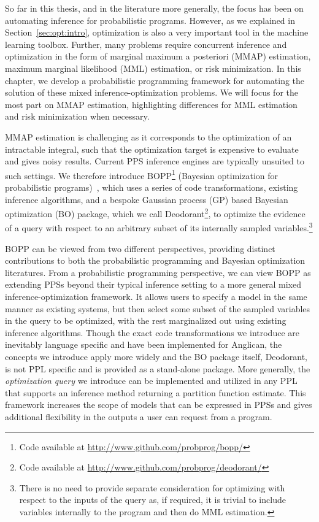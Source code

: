 
So far in this thesis, and in the literature more generally, the focus has been on automating
inference for probabilistic programs.  However, as we explained in Section~\ref{sec:opt:intro},
optimization is also a very important tool in the machine learning toolbox.  Further, many problems
require concurrent inference and optimization in the form of marginal maximum a posteriori (MMAP) estimation,
maximum marginal likelihood (MML) estimation, or risk minimization.  In this chapter, we develop a probabilistic programming framework
for automating the solution of these mixed inference-optimization problems.
We will focus for the most part on
MMAP estimation, highlighting differences for MML estimation and risk minimization when necessary.

MMAP estimation is challenging as it corresponds to the optimization of an intractable integral, such that the 
optimization target is expensive to evaluate and gives noisy results.  Current PPS inference engines are 
typically unsuited to such settings.  We therefore introduce BOPP\footnote{Code available at \url{http://www.github.com/probprog/bopp/}}
(Bayesian optimization for probabilistic programs)~\citep{rainforth2015workshopbopp,rainforth2016bayesian}, 
which uses a series of code transformations, existing inference algorithms,
and a bespoke Gaussian process (GP) based Bayesian optimization (BO) package, which we call Deodorant\footnote{Code available
at \url{http://www.github.com/probprog/deodorant/}}, to optimize the evidence of a query with respect to
an arbitrary subset of its internally sampled variables.\footnote{There is no need to
	provide separate consideration for optimizing with respect to the inputs of the query as, if required,
	it is trivial to include variables internally to the program and then do MML estimation.}

BOPP can be viewed from two different perspectives, providing distinct contributions to both the probabilistic
programming and Bayesian optimization literatures.  From a probabilistic programming perspective, we can
view BOPP as extending PPSs beyond their typical inference setting to a more
general mixed inference-optimization framework.  It allows users to specify a model in the same manner 
as existing systems, but then select some subset of the sampled variables in the query to be optimized, 
with the rest marginalized out using existing inference algorithms.  Though the exact code transformations we
introduce are inevitably language specific and have been implemented for Anglican, the concepts we
introduce apply more widely and the BO package itself, Deodorant, is not PPL specific and is provided
as a stand-alone package.  More generally, the \textit{optimization query} we 
introduce can be implemented and utilized in any PPL that supports an inference method returning a 
partition function estimate.  This framework increases the scope of models that can be expressed in
PPSs and gives additional flexibility in the outputs a user can request from a program.

